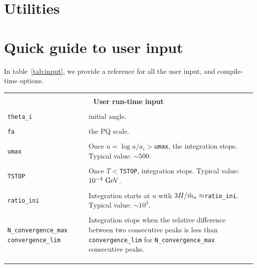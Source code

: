 \documentclass[11pt,a4paper]{article}
\begin{document}
\section{Utilities}\label{app:util}
\setcounter{equation}{0}

\section{Quick guide to user input}\label{app:usr_input}
\setcounter{equation}{0}
In table~\ref{tab:input}, we provide a reference for all the user input, and compile-time options.
%
\begin{table}[h!]
	\centering
	\begin{tabular}{l l}
		\hline\\[-0.4cm]
		\multicolumn{2}{c}{\bf User run-time input}  \\
		\hline\\[-0.4cm]

		{\tt theta\_i} & initial angle.  \\
		\hline\\[-0.4cm]

		{\tt fa} & the PQ scale.\\
		\hline\\[-0.4cm]

		{\tt umax } & Once $u=\log a/a_i>${\tt umax}, the integration stops. Typical value: $\sim 500$.\\
		\hline\\[-0.4cm]

		{\tt TSTOP} & Once $T<${\tt TSTOP}, integration stops. Typical value: $10^{-4}~{\rm GeV}$.\\
		\hline\\[-0.4cm]

 		{\tt ratio\_ini}& Integration starts at $u$ with $3H/\tilde m_{a}{} \approx${\tt ratio\_ini}. Typical value: $\sim 10^{3}$.\\
		\hline\\[-0.4cm]

		\multirow{1}{4cm}{{\tt N\_convergence\_max} {\tt convergence\_lim}} & \multirow{1}{12cm}{Integration stops when  the relative difference 
		between two consecutive peaks  is less than {\tt convergence\_lim} for {\tt N\_convergence\_max} 
		consecutive peaks. } \\ \\ \\ 
		\hline\\[-0.4cm]


\end{tabular}
\end{table}
\end{document}
